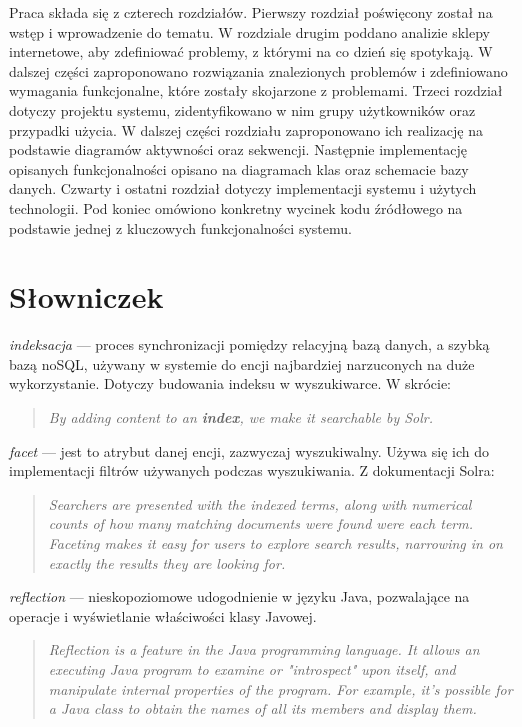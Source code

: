 Praca składa się z czterech rozdziałów. Pierwszy rozdział poświęcony został na wstęp i wprowadzenie do tematu. W rozdziale drugim poddano analizie sklepy internetowe, aby zdefiniować problemy, z którymi na co dzień się spotykają. W dalszej części zaproponowano rozwiązania znalezionych problemów i zdefiniowano wymagania funkcjonalne, które zostały skojarzone z problemami. Trzeci rozdział dotyczy projektu systemu, zidentyfikowano w nim grupy użytkowników oraz przypadki użycia. W dalszej części rozdziału zaproponowano ich realizację na podstawie diagramów aktywności oraz sekwencji. Następnie implementację opisanych funkcjonalności opisano na diagramach klas oraz schemacie bazy danych. Czwarty i ostatni rozdział dotyczy implementacji systemu i użytych technologii. Pod koniec omówiono konkretny wycinek kodu źródłowego na podstawie jednej z kluczowych funkcjonalności systemu. 
 
\newpage
\section{Słowniczek}
\noindent
\textit{indeksacja} — proces synchronizacji pomiędzy relacyjną bazą danych, a szybką bazą noSQL, używany w systemie do encji najbardziej narzuconych na duże wykorzystanie. Dotyczy budowania indeksu w wyszukiwarce. W skrócie: 
\begin{quote}
	\textit{By adding content to an \textbf{index}, we make it searchable by Solr.}\cite{Solr-doc} 
\end{quote}

\noindent
\textit{facet} — jest to atrybut danej encji, zazwyczaj wyszukiwalny. Używa się ich do implementacji filtrów używanych podczas wyszukiwania. Z dokumentacji Solra:
\begin{quote} \textit{
	Searchers are presented with the indexed terms, along with numerical counts of how many matching documents were found were each term. Faceting makes it easy for users to explore search results, narrowing in on exactly the results they are looking for.
	}\cite{Solr-doc}
\end{quote}

\noindent
\textit{reflection} — nieskopoziomowe udogodnienie w języku Java, pozwalające na operacje i wyświetlanie właściwości klasy Javowej.
\begin{quote} \textit{
		Reflection is a feature in the Java programming language. It allows an executing Java program to examine or "introspect" upon itself, and manipulate internal properties of the program. For example, it's possible for a Java class to obtain the names of all its members and display them.
	}\cite{oracle}
\end{quote}




